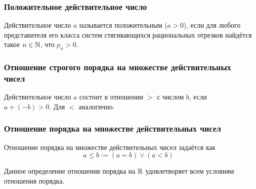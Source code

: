 \subsubsection{Положительное действительное число}

\begin{definition}
    Действительное число $a$ называется положительным ($a > 0$), если для любого представителя его класса систем стягивающихся рациональных отрезков найдётся такое $n \in \mathbb{N}$, что $p_n > 0$.
\end{definition}

\subsubsection{Отношение строгого порядка на множестве действительных чисел}

\begin{definition}
    Действительное число $a$ состоит в отношении $>$ с числом $b$, если $a + (-b) > 0$. Для $<$ аналогично.
\end{definition}

\subsubsection{Отношение порядка на множестве действительных чисел}

\begin{definition}
    Отношение порядка на множестве действительных чисел задаётся как
    $$
        a \le b := (a = b) \vee (a < b)
    $$
\end{definition}

\begin{proposition}
    Данное определение отношения порядка на $\mathbb{R}$ удовлетворяет всем условиям отношения порядка.
\end{proposition}

